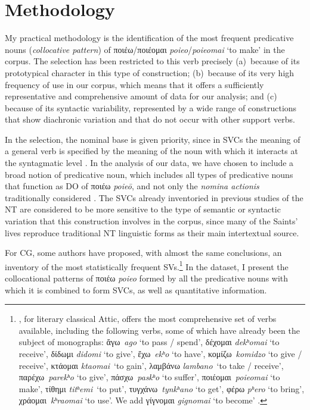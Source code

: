 \documentclass[output=paper,colorlinks,citecolor=brown]{langscibook}
\begin{document}
\section{Methodology}\label{sec:vc:4}

My practical methodology is the identification of the most frequent predicative nouns
(\emph{collocative pattern}) of ποιέω/ποιέομαι \emph{poieo}/\emph{poieomai} `to make' in
the corpus. The selection has been restricted to this verb precisely (a)~because of its
prototypical character in this type of construction; (b)~because of its very high
frequency of use in our corpus, which means that it offers a sufficiently representative
and comprehensive amount of data for our analysis; and (c) because of its syntactic
variability, represented by a wide range of constructions that show diachronic variation
and that do not occur with other support verbs.

In the selection, the nominal base is given priority, since in SVCs the meaning of a
general verb is specified by the meaning of the noun with which it interacts at the
syntagmatic level \parencite[29]{JezekElisabetta-201155}. In the analysis of our data, we
have chosen to include a broad notion of predicative noun, which includes all types of
predicative nouns that function as DO of ποιέω \emph{poieō}, and not only the \emph{nomina
  actionis} traditionally considered
\parencite{GarzónFontalvoEvelynandCristinaTur-2022234}. The SVCs already inventoried in
previous studies of the NT
\parencites{BanosJoséMiguelandMaríaDoloresJiménezLópezLópez-2017484,BanosJoséMiguelandMaríaDoloresJiménezLópezLópez-2017484}
are considered to be more sensitive to the type of semantic or syntactic variation that
this construction involves in the corpus, since many of the Saints' lives
reproduce traditional NT linguistic forms as their main intertextual source.

For CG, some authors \parencites{JiménezLópezMaríaDolores-2016731,FendelVictoria-2023591}
have proposed, with almost the same conclusions, an inventory of the most statistically
frequent SVs.\footnote{\citet{FendelVictoria-2023591}, for literary classical Attic,
  offers the most comprehensive set of verbs available, including the following verbs,
  some of which have already been the subject of monographs: ἄγω~\emph{ago} `to pass /
  spend', δέχομαι \emph{dekʰomai}
  `to receive', δίδωμι \emph{didomi} `to give', ἔχω~\emph{ekʰo} `to
  have', κομίζω~\emph{komidzo} `to give / receive', κτάομαι \emph{ktaomai}~`to gain',
  λαμβάνω \emph{lambano}~`to take / receive', παρέχω~\emph{parekʰo} `to
  give', πάσχω~\emph{paskʰo} `to suffer', ποιέομαι~\emph{poieomai} `to
  make', τίθημι \emph{titʰemi}~`to put',
  τυγχάνω~\emph{tynkʰano} `to get', φέρω \emph{pʰero}
  `to bring', χράομαι~\emph{kʰraomai} `to use'. We add γίγνομαι \emph{gignomai} `to become'
  \parencite{JiménezLópezMaríaDolores-2021150}.} In the dataset, I present the collocational patterns of ποιέω \emph{poieo}
formed by all the predicative nouns with which it is combined to form SVCs, as well as
quantitative information.
\end{document}
